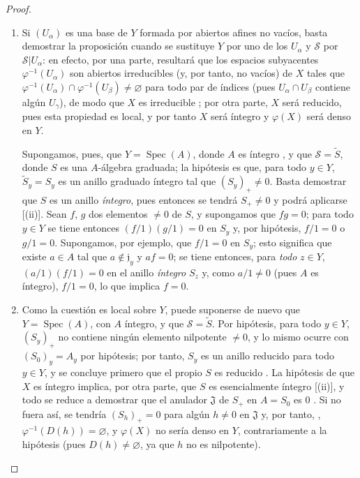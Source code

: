 \documentclass[oneside,10pt]{amsart}
\newcommand{\oldpage}[2][]{\marginnote{\normalfont\footnotesize\textbf{#1}~|~#2}\ignorespaces}
\begin{document}
\begin{proof}
\medskip\noindent
\begin{enumerate}
  \item[(i)] Si $(U_\alpha)$ es una base de $Y$ formada por abiertos afines no vacíos, basta demostrar la proposición cuando se sustituye $Y$ por uno de los $U_\alpha$ y $\mathcal{S}$ por $\mathcal{S}|U_\alpha$: en efecto, por una parte, resultará que los espacios subyacentes $\varphi^{-1}(U_\alpha)$ son abiertos irreducibles (y, por tanto, no vacíos) de $X$ tales que $\varphi^{-1}(U_\alpha)\cap\varphi^{-1}(U_\beta)\neq\varnothing$ para todo par de índices (pues $U_\alpha\cap U_\beta$ contiene algún $U_\gamma$), de modo que $X$ es irreducible ; por otra parte, $X$ será reducido, pues esta propiedad es local, y por tanto $X$ será íntegro y $\varphi(X)$ será denso en $Y$.

    Supongamos, pues, que $Y=\operatorname{Spec}(A)$, donde $A$ es íntegro , y que $\mathcal{S}=\widetilde{S}$, donde $S$ es una $A$-álgebra graduada; la hipótesis es que, para todo $y\in Y$, $\widetilde{S}_y=S_y$ es un anillo graduado íntegro tal que $(S_y)_+\neq0$.
    Basta demostrar que $S$ es un anillo \emph{íntegro}, pues entonces se tendrá $S_+\neq0$ y podrá aplicarse [(ii)].
    Sean $f$, $g$ dos elementos $\neq0$ de $S$, y supongamos que $fg=0$; para todo $y\in Y$ se tiene entonces $(f/1)(g/1)=0$ en $S_y$ y, por hipótesis, $f/1=0$ o $g/1=0$.
    Supongamos, por ejemplo, que $f/1=0$ en $S_y$; esto significa que existe $a\in A$ tal que $a\notin\mathfrak{j}_y$ y $af=0$; se tiene entonces, para \emph{todo} $z\in Y$, $(a/1)(f/1)=0$ en el anillo \emph{íntegro} $S_z$ y, como $a/1\neq0$ (pues $A$ es íntegro), $f/1=0$, lo que implica $f=0$.
  \item[(ii)] Como la cuestión es local sobre $Y$, puede suponerse de nuevo que $Y=\operatorname{Spec}(A)$, con $A$ íntegro, y que $\mathcal{S}=\widetilde{S}$.
    Por hipótesis, para todo $y\in Y$, $(S_y)_+$ no contiene ningún elemento nilpotente $\neq0$, y lo mismo ocurre con $(S_0)_y=A_y$ por hipótesis; por tanto, $S_y$ es un anillo reducido para todo $y\in Y$, y se concluye primero que el propio $S$ es reducido .
    La hipótesis de que $X$ es íntegro implica, por otra parte, que $S$ es esencialmente íntegro [(ii)], y todo se reduce a demostrar que el anulador $\mathfrak{J}$ de $S_+$ en $A=S_0$ es
\oldpage[II]{54}
 $0$ .
    Si no fuera así, se tendría $(S_h)_+=0$ para algún $h\neq0$ en $\mathfrak{J}$ y, por tanto, , $\varphi^{-1}(D(h))=\varnothing$, y $\varphi(X)$ no sería denso en $Y$, contrariamente a la hipótesis (pues $D(h)\neq\varnothing$, ya que $h$ no es nilpotente).

\end{enumerate}
\end{proof}
\end{document}
